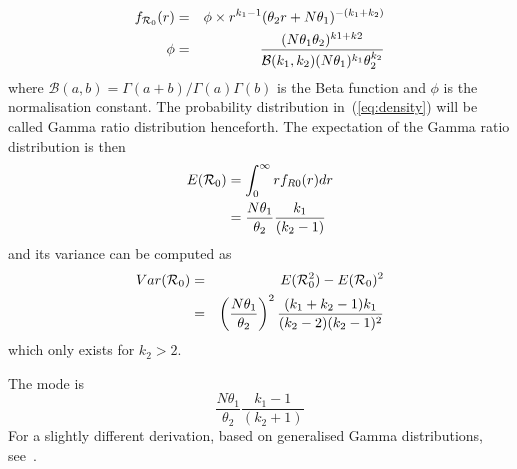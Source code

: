 \documentclass[11pt]{article}
\begin{document}
\begin{eqnarray}
\label{eq:density}
f_{{\cal R}_0}(r) &=& \phi\times\space r^{k_1-1} (\theta_2 r + N\theta_1)^{-(k_1 + k_2)} \\
\label{eq:normconst}
\phi &=&  \frac{(N\theta_1\theta_2)^{k1+k2}}{\mathcal{B}(k_1, k_2)(N\theta_1)^{k_1}\theta_2^{k_2} }
\end{eqnarray}
where $\mathcal{B}(a, b) = \Gamma(a + b)/\Gamma(a)\Gamma(b)$ is the Beta function  and $\phi$ is the normalisation constant.
The probability distribution in~(\ref{eq:density}) will be called Gamma ratio distribution henceforth.
The expectation of the Gamma ratio distribution is then
\begin{align}
\label{eq:expR0}
E({\cal R}_0) &= \int_{0}^{\infty}rf_{R0}(r)dr \\
       &= \frac{N\theta_1}{\theta_2}\frac{k_1}{(k_2-1)}
\end{align}
and its variance can be computed as
\begin{eqnarray}
\label{eq:var1}
Var({\cal R}_0) &=& E({\cal R}_0^2) - E({\cal R}_0)^2  \\
\label{eq:var2}
 &=& \left(\frac{N\theta_1}{\theta_2}\right)^2\frac{(k_1+k_2-1)k_1}{(k_2-2)(k_2-1)^2}
\end{eqnarray}
which only exists for $k_2 > 2$.

The mode is 
\begin{equation}
\label{eq:mode}
\frac{N\theta_1}{\theta_2}\frac{k_1 - 1}{(k_2 + 1)}
\end{equation}
For a slightly different derivation, based on generalised Gamma distributions, see~\cite{Coelho2007}.
\end{document}
